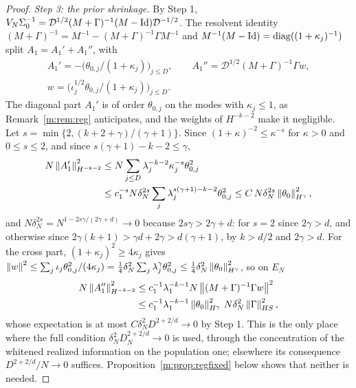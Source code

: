 \begin{proof}
\emph{Step 3: the prior shrinkage.} By Step 1, $V_N\Sigma_0^{-1}=\mathcal D^{1/2}(M+\Gamma)^{-1}(M-\operatorname{Id})\mathcal D^{-1/2}$. The resolvent identity $(M+\Gamma)^{-1}=M^{-1}-(M+\Gamma)^{-1}\Gamma M^{-1}$ and $M^{-1}(M-\operatorname{Id})=\operatorname{diag}((1+\kappa_j)^{-1})$ split $A_1=A_1'+A_1''$, with
\[
\begin{gathered}
A_1'=-\big(\theta_{0,j}/(1+\kappa_j)\big)_{j\le D},\qquad A_1''=\mathcal D^{1/2}(M+\Gamma)^{-1}\Gamma w,\\
w=\big(\iota_j^{1/2}\theta_{0,j}/(1+\kappa_j)\big)_{j\le D}.
\end{gathered}
\]
The diagonal part $A_1'$ is of order $\theta_{0,j}$ on the modes with $\kappa_j\le1$, as Remark~\ref{m:rem:reg} anticipates, and the weights of $H^{-k-2}$ make it negligible. Let $s=\min\{2,(k+2+\gamma)/(\gamma+1)\}$. Since $(1+\kappa)^{-2}\le\kappa^{-s}$ for $\kappa>0$ and $0\le s\le2$, and since $s(\gamma+1)-k-2\le\gamma$,
\[
\begin{aligned}
N\left\|A_1'\right\|^2_{H^{-k-2}}&\le N\sum_{j\le D}\lambda_j^{-k-2}\kappa_j^{-s}\theta_{0,j}^2\\
&\le c_1^{-s}N\delta_N^{2s}\sum_j\lambda_j^{s(\gamma+1)-k-2}\theta^2_{0,j}\le C\,N\delta_N^{2s}\left\|\theta_0\right\|^2_{H^\gamma},
\end{aligned}
\]
and $N\delta_N^{2s}=N^{1-2s\gamma/(2\gamma+d)}\to0$ because $2s\gamma>2\gamma+d$: for $s=2$ since $2\gamma>d$, and otherwise since $2\gamma(k+1)>\gamma d+2\gamma>d(\gamma+1)$, by $k>d/2$ and $2\gamma>d$. For the cross part, $(1+\kappa_j)^2\ge4\kappa_j$ gives $\left\|w\right\|^2\le\sum_j\iota_j\theta^2_{0,j}/(4\kappa_j)=\tfrac14\delta_N^2\sum_j\lambda_j^\gamma\theta_{0,j}^2\le\tfrac14\delta_N^2\left\|\theta_0\right\|^2_{H^\gamma}$, so on $E_N$
\[
\begin{aligned}
N\left\|A_1''\right\|^2_{H^{-k-2}}&\le c_1^{-1}\lambda_1^{-k-1}N\left\|(M+\Gamma)^{-1}\Gamma w\right\|^2\\
&\le c_1^{-1}\lambda_1^{-k-1}\left\|\theta_0\right\|^2_{H^\gamma}\,N\delta_N^2\left\|\Gamma\right\|^2_{HS},
\end{aligned}
\]
whose expectation is at most $C\delta_N^2D^{2+2/d}\to0$ by Step 1. This is the only place where the full condition $\delta_N^2D_N^{2+2/d}\to0$ is used, through the concentration of the whitened realized information on the population one; elsewhere its consequence $D^{2+2/d}/N\to0$ suffices. Proposition~\ref{m:prop:regfixed} below shows that neither is needed.


\end{proof}
